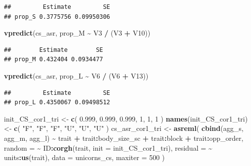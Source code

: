 \documentclass[
  12pt,
]{book}
\newenvironment{Shaded}{\begin{snugshade}}{\end{snugshade}}
\newcommand{\DataTypeTok}[1]{\textcolor[rgb]{0.13,0.29,0.53}{#1}}
\newcommand{\DecValTok}[1]{\textcolor[rgb]{0.00,0.00,0.81}{#1}}
\newcommand{\FloatTok}[1]{\textcolor[rgb]{0.00,0.00,0.81}{#1}}
\newcommand{\KeywordTok}[1]{\textcolor[rgb]{0.13,0.29,0.53}{\textbf{#1}}}
\newcommand{\NormalTok}[1]{#1}
\newcommand{\OperatorTok}[1]{\textcolor[rgb]{0.81,0.36,0.00}{\textbf{#1}}}
\newcommand{\StringTok}[1]{\textcolor[rgb]{0.31,0.60,0.02}{#1}}
\begin{document}
\begin{verbatim}
##         Estimate         SE
## prop_S 0.3775756 0.09950306
\end{verbatim}

\begin{Shaded}
\begin{Highlighting}[]
\KeywordTok{vpredict}\NormalTok{(cs\_asr, prop\_M }\OperatorTok{\textasciitilde{}}\StringTok{ }\NormalTok{V3 }\OperatorTok{/}\StringTok{ }\NormalTok{(V3 }\OperatorTok{+}\StringTok{ }\NormalTok{V10))}
\end{Highlighting}
\end{Shaded}

\begin{verbatim}
##        Estimate        SE
## prop_M 0.432404 0.0934477
\end{verbatim}

\begin{Shaded}
\begin{Highlighting}[]
\KeywordTok{vpredict}\NormalTok{(cs\_asr, prop\_L }\OperatorTok{\textasciitilde{}}\StringTok{ }\NormalTok{V6 }\OperatorTok{/}\StringTok{ }\NormalTok{(V6 }\OperatorTok{+}\StringTok{ }\NormalTok{V13))}
\end{Highlighting}
\end{Shaded}

\begin{verbatim}
##         Estimate         SE
## prop_L 0.4350067 0.09498512
\end{verbatim}

\begin{Shaded}
\begin{Highlighting}[]
\NormalTok{init\_CS\_cor1\_tri \textless{}{-}}\StringTok{ }\KeywordTok{c}\NormalTok{(}
  \FloatTok{0.999}\NormalTok{,}
  \FloatTok{0.999}\NormalTok{, }\FloatTok{0.999}\NormalTok{,}
  \DecValTok{1}\NormalTok{, }\DecValTok{1}\NormalTok{, }\DecValTok{1}
\NormalTok{)}
\KeywordTok{names}\NormalTok{(init\_CS\_cor1\_tri) \textless{}{-}}\StringTok{ }\KeywordTok{c}\NormalTok{(}
  \StringTok{"F"}\NormalTok{,}
  \StringTok{"F"}\NormalTok{, }\StringTok{"F"}\NormalTok{,}
  \StringTok{"U"}\NormalTok{, }\StringTok{"U"}\NormalTok{, }\StringTok{"U"}
\NormalTok{)}
\NormalTok{cs\_asr\_cor1\_tri \textless{}{-}}\StringTok{ }\KeywordTok{asreml}\NormalTok{(}
  \KeywordTok{cbind}\NormalTok{(agg\_s, agg\_m, agg\_l) }\OperatorTok{\textasciitilde{}}\StringTok{ }\NormalTok{trait }\OperatorTok{+}\StringTok{ }\NormalTok{trait}\OperatorTok{:}\NormalTok{body\_size\_sc }\OperatorTok{+}
\StringTok{    }\NormalTok{trait}\OperatorTok{:}\NormalTok{block }\OperatorTok{+}
\StringTok{    }\NormalTok{trait}\OperatorTok{:}\NormalTok{opp\_order,}
  \DataTypeTok{random =} \OperatorTok{\textasciitilde{}}\StringTok{ }\NormalTok{ID}\OperatorTok{:}\KeywordTok{corgh}\NormalTok{(trait, }\DataTypeTok{init =}\NormalTok{ init\_CS\_cor1\_tri),}
\DataTypeTok{residual =} \OperatorTok{\textasciitilde{}}\StringTok{ }\NormalTok{units}\OperatorTok{:}\KeywordTok{us}\NormalTok{(trait),}
\DataTypeTok{data =}\NormalTok{ unicorns\_cs,}
\DataTypeTok{maxiter =} \DecValTok{500}
\NormalTok{)}
\end{Highlighting}
\end{Shaded}
\end{document}
